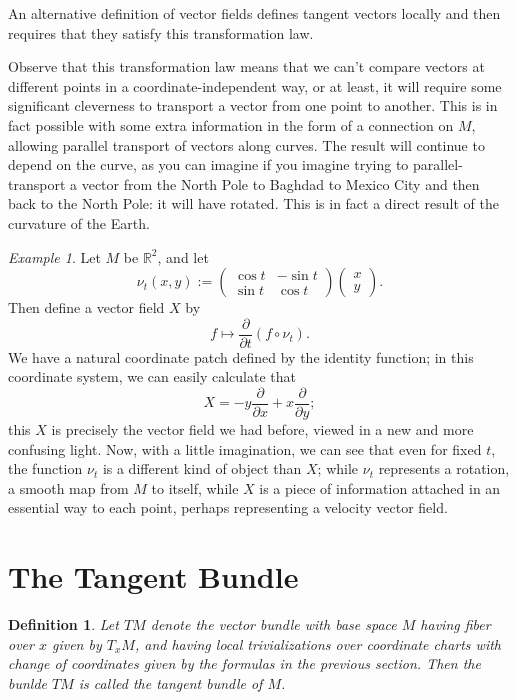 \documentclass{article}
\newtheorem*{defn}{Definition}
\theoremstyle{remark}
\newtheorem*{example}{Example}
\begin{document}
An alternative definition of vector fields defines tangent vectors locally and then requires that they satisfy this transformation law.  

Observe that this transformation law means that we can't compare vectors at different points in a coordinate-independent way, or at least, it will require some significant cleverness to transport a vector from one point to another.  This is in fact possible with some extra information in the form of a connection on $M$, allowing parallel transport of vectors along curves.  The result will continue to depend on the curve, as you can imagine if you imagine trying to parallel-transport a vector from the North Pole to Baghdad to Mexico City and then back to the North Pole: it will have rotated.  This is in fact a direct result of the curvature of the Earth. 

\begin{example}
Let $M$ be $\mathbb{R}^2$, and let 
\[
\nu_t(x,y):=\begin{pmatrix}
\cos t & -\sin t \\
\sin t & \cos t
\end{pmatrix}\begin{pmatrix}
x \\
y
\end{pmatrix}.
\]
Then define a vector field $X$ by
\[
f \mapsto \frac{\partial}{\partial t}(f\circ\nu_t).
\]
We have a natural coordinate patch defined by the identity function; in this coordinate system, we can easily calculate that
\[
X = -y\frac{\partial}{\partial x} + x\frac{\partial}{\partial y};
\]
this $X$ is precisely the vector field we had before, viewed in a new and more confusing light.  Now, with a little imagination, we can see that even for fixed $t$, the function $\nu_t$ is a different kind of object than $X$; while $\nu_t$ represents a rotation, a smooth map from $M$ to itself, while $X$ is a piece of information attached in an essential way to each point, perhaps representing a velocity vector field. 
\end{example}

\section*{The Tangent Bundle}

\begin{defn}
Let $TM$ denote the vector bundle with base space $M$ having fiber over $x$ given by $T_xM$, and having local trivializations over coordinate charts with change of coordinates given by the formulas in the previous section.  Then the bunlde $TM$ is called the \emph{tangent bundle} of $M$.
\end{defn}
\end{document}
